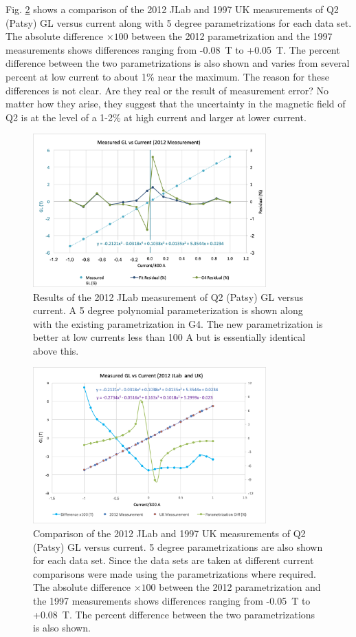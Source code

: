 \documentclass[12pt]{article}
\begin{document}
Fig. \ref{fig:Pasty2012UKcomp} shows a comparison of the 2012 JLab and 1997 UK measurements of Q2 (Patsy) GL versus current along with 5 degree parametrizations for each data set. The absolute difference $\times100$ between the 2012 parametrization and the 1997 measurements shows differences ranging from -0.08~T to +0.05~T. The percent difference between the two parametrizations is also shown and varies from several percent at low current to about 1\% near the maximum. The reason for these differences is not clear. Are they real or the result of measurement error? No matter how they arise, they suggest that the uncertainty in the magnetic field of Q2 is at the level of a 1-2\% at high current and larger at lower current.
 \begin{figure}[!h]
\centering
\includegraphics[width=0.8\textwidth]{Patsy2012.png}
\caption{\label{fig:Pasty2012} Results of the 2012 JLab measurement of Q2 (Patsy) GL versus current. A 5 degree polynomial parameterization is shown along with the existing parametrization in G4. The new parametrization is better at low currents less than 100 A but is essentially identical above this.}
\end{figure}
\begin{figure}[!h]
\centering
\includegraphics[width=0.8\textwidth]{Patsy2012UKcomp.png}
\caption{\label{fig:Pasty2012UKcomp} Comparison of the 2012 JLab and 1997 UK measurements of Q2 (Patsy) GL versus current. 5 degree parametrizations are also shown for each data set. Since the data sets are taken at different current comparisons were made using the parametrizations where required. The absolute difference $\times100$ between the 2012 parametrization and the 1997 measurements shows differences ranging from -0.05~T to +0.08~T. The percent difference between the two parametrizations is also shown.}
\end{figure}
%


\end{document}
